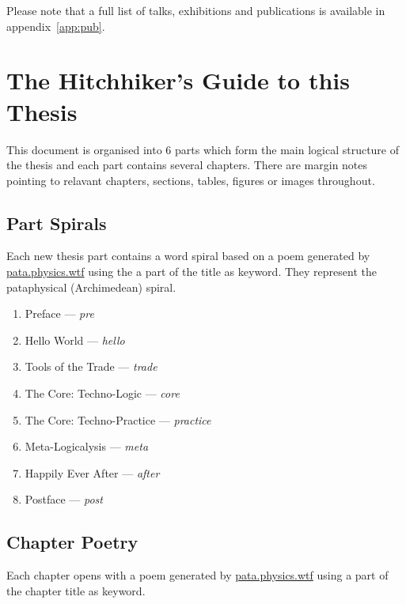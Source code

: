 Please note that a full list of talks, exhibitions and publications is available in appendix~\ref{app:pub}.


\section{The Hitchhiker's Guide to this Thesis}

%   

% 

This document is organised into 6 parts which form the main logical structure of the thesis and each part contains several chapters. There are margin notes pointing to relavant chapters, sections, tables, figures or images throughout.

\subsection*{Part Spirals}

Each new thesis part contains a word spiral based on a poem generated by \url{pata.physics.wtf} using the a part of the title as keyword. They represent the pataphysical (Archimedean) spiral.

\begin{enumerate}
  \item Preface --- \textit{pre}
  \item Hello World --- \textit{hello}
  \item Tools of the Trade --- \textit{trade}
  \item The Core: Techno-Logic --- \textit{core}
  \item The Core: Techno-Practice --- \textit{practice}
  \item Meta-Logicalysis --- \textit{meta}
  \item Happily Ever After --- \textit{after}
  \item Postface --- \textit{post}
\end{enumerate}


\subsection*{Chapter Poetry}

Each chapter opens with a poem generated by \url{pata.physics.wtf} using a part of the chapter title as keyword.

